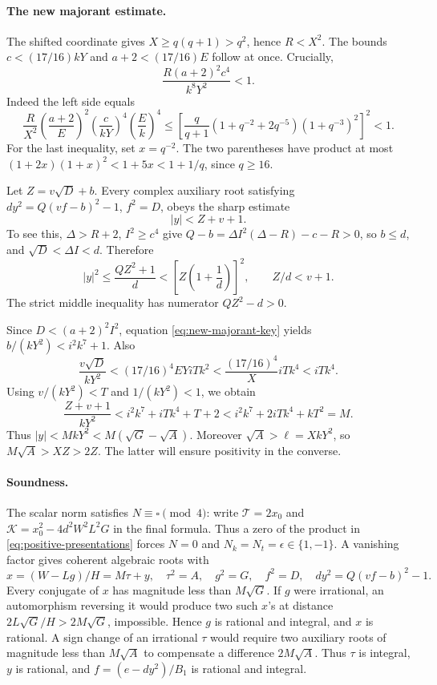 \paragraph{The new majorant estimate.}
The shifted coordinate gives \(X\ge q(q+1)>q^2\), hence \(R<X^2\).
The bounds
\(c<(17/16)kY\) and \(a+2<(17/16)E\) follow at once.
Crucially,
\begin{equation}
\frac{R(a+2)^2c^4}{k^8Y^2}<1.
\label{eq:new-majorant-key}
\end{equation}
Indeed the left side equals
\[
\frac R{X^2}\left(\frac{a+2}{E}\right)^2
\left(\frac c{kY}\right)^4\left(\frac Ek\right)^4
\le\left[\frac q{q+1}(1+q^{-2}+2q^{-5})(1+q^{-3})^2\right]^2<1.
\]
For the last inequality, set \(x=q^{-2}\). The two parentheses have
product at most \((1+2x)(1+x)^2<1+5x<1+1/q\), since \(q\ge16\).

Let \(Z=v\sqrt D+b\). Every complex auxiliary root satisfying
\(dy^2=Q(vf-b)^2-1\), \(f^2=D\), obeys the sharp estimate
\begin{equation}
|y|<Z+v+1.
\label{eq:positive-sharp-y}
\end{equation}
To see this, \(\Delta>R+2\), \(I^2\ge c^4\) give
\(Q-b=\Delta I^2(\Delta-R)-c-R>0\), so \(b\le d\), and
\(\sqrt D<\Delta I<d\). Therefore
\[
|y|^2\le\frac{QZ^2+1}d
<\left[Z\left(1+\frac1d\right)\right]^2,
\qquad Z/d<v+1.
\]
The strict middle inequality has numerator \(QZ^2-d>0\).

Since \(D<(a+2)^2I^2\), equation \eqref{eq:new-majorant-key} yields
\(b/(kY^2)<i^2k^7+1\). Also
\[
\frac{v\sqrt D}{kY^2}
<(17/16)^4EYiTk^2
<\frac{(17/16)^4}{X}iTk^4<iTk^4.
\]
Using \(v/(kY^2)<T\) and \(1/(kY^2)<1\), we obtain
\[
\frac{Z+v+1}{kY^2}<i^2k^7+iTk^4+T+2
<i^2k^7+2iTk^4+kT^2=M.
\]
Thus \(|y|<MkY^2<M(\sqrt G-\sqrt A)\).
Moreover \(\sqrt A>\ell=XkY^2\), so
\(M\sqrt A>XZ>2Z\). The latter will ensure positivity in the converse.

\paragraph{Soundness.}
The scalar norm satisfies \(N\equiv\square\pmod4\): write
\(\mathcal T=2x_0\) and
\(\mathcal K=x_0^2-4d^2W^2L^2G\) in the final formula. Thus a zero of
the product in \eqref{eq:positive-presentations} forces \(N=0\) and
\(N_k=N_t=\epsilon\in\{1,-1\}\). A vanishing factor gives coherent
algebraic roots with
\[
x=(W-Lg)/H=M\tau+y,\quad \tau^2=A,\quad g^2=G,\quad f^2=D,
\quad dy^2=Q(vf-b)^2-1.
\]
Every conjugate of \(x\) has magnitude less than \(M\sqrt G\).
If \(g\) were irrational, an automorphism reversing it would produce
two such \(x\)'s at distance \(2L\sqrt G/H>2M\sqrt G\), impossible.
Hence \(g\) is rational and integral, and \(x\) is rational. A sign
change of an irrational \(\tau\) would require two auxiliary roots of
magnitude less than \(M\sqrt A\) to compensate a difference
\(2M\sqrt A\). Thus \(\tau\) is integral, \(y\) is rational, and
\(f=(e-dy^2)/B_1\) is rational and integral.

